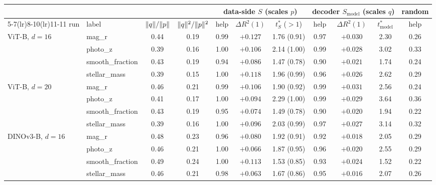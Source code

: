\begin{tabular}{llccccccccc}
\toprule
 & & & & \multicolumn{3}{c}{data-side $S$ (scales $p$)} & \multicolumn{3}{c}{decoder $S_{\mathrm{model}}$ (scales $q$)} & random \\
\cmidrule(lr){5-7}\cmidrule(lr){8-10}\cmidrule(lr){11-11}
run & label & $\lVert q \rVert/\lVert p \rVert$ & $\lVert q \rVert^2/\lVert p \rVert^2$ & help & $\Delta R^2(1)$ & $t^*_S$ ($>1$) & help & $\Delta R^2(1)$ & $t^*_{\mathrm{model}}$ & help \\
\midrule
ViT-B, $d=16$ & mag\_r & 0.44 & 0.19 & 0.99 & $+0.127$ & 1.76 (0.91) & 0.97 & $+0.030$ & 2.30 & 0.26 \\
 & photo\_z & 0.39 & 0.16 & 1.00 & $+0.106$ & 2.14 (1.00) & 0.99 & $+0.028$ & 3.02 & 0.33 \\
 & smooth\_fraction & 0.43 & 0.19 & 0.94 & $+0.086$ & 1.47 (0.78) & 0.90 & $+0.021$ & 1.74 & 0.24 \\
 & stellar\_mass & 0.39 & 0.15 & 1.00 & $+0.118$ & 1.96 (0.99) & 0.96 & $+0.026$ & 2.62 & 0.29 \\
\addlinespace[2pt]
ViT-B, $d=20$ & mag\_r & 0.46 & 0.21 & 0.99 & $+0.106$ & 1.90 (0.92) & 0.99 & $+0.031$ & 2.56 & 0.24 \\
 & photo\_z & 0.41 & 0.17 & 1.00 & $+0.094$ & 2.29 (1.00) & 0.99 & $+0.029$ & 3.64 & 0.36 \\
 & smooth\_fraction & 0.43 & 0.19 & 0.95 & $+0.074$ & 1.49 (0.78) & 0.90 & $+0.020$ & 1.94 & 0.22 \\
 & stellar\_mass & 0.39 & 0.16 & 1.00 & $+0.096$ & 2.03 (0.99) & 0.97 & $+0.027$ & 3.14 & 0.32 \\
\addlinespace[2pt]
DINOv3-B, $d=16$ & mag\_r & 0.48 & 0.23 & 0.96 & $+0.080$ & 1.92 (0.91) & 0.92 & $+0.018$ & 2.05 & 0.29 \\
 & photo\_z & 0.46 & 0.21 & 1.00 & $+0.066$ & 1.87 (0.95) & 0.96 & $+0.020$ & 2.55 & 0.29 \\
 & smooth\_fraction & 0.49 & 0.24 & 1.00 & $+0.113$ & 1.53 (0.85) & 0.93 & $+0.024$ & 1.52 & 0.22 \\
 & stellar\_mass & 0.46 & 0.21 & 0.98 & $+0.063$ & 1.67 (0.86) & 0.95 & $+0.016$ & 2.07 & 0.26 \\

\end{tabular}
